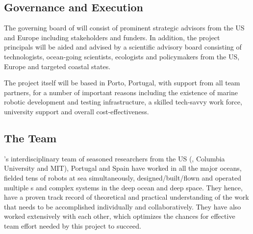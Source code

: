 


\subsection{Governance and Execution}


The governing board of \pro will consist of prominent strategic
advisors from the US and Europe including stakeholders and funders. In
addition, the project principals will be aided and advised by a
scientific advisory board consisting of technologists, ocean-going
scientists, ecologists and policymakers from the US, Europe and
targeted coastal states.

The project itself will be based in Porto, Portugal, with support from
all team partners, for a number of important reasons including the
existence of marine robotic development and testing infrastructure, a
skilled tech-savvy work force, university support and overall
cost-effectiveness.  %

\subsection{The Team}

\proe’s interdisciplinary team of seasoned researchers from the US
(\orge, Columbia University and MIT), Portugal and Spain have worked
in all the major oceans, fielded tens of robots at sea simultaneously,
designed/built/flown and operated multiple \smle s and complex systems
in the deep ocean and deep space. They hence, have a proven track
record of theoretical and practical understanding of the work that
needs to be accomplished individually and collaboratively. They have
also worked extensively with each other, which optimizes the chances
for effective team effort needed by this project to succeed.

